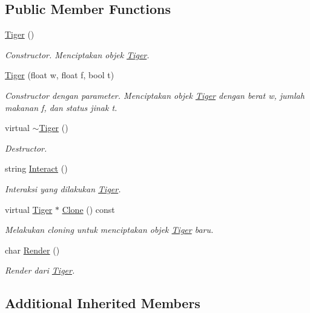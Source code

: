 \subsection*{Public Member Functions}
\begin{DoxyCompactItemize}
\item 
\hyperlink{classTiger_ab2b455a0cdbd21f2052eef2a176f0eeb}{Tiger} ()
\begin{DoxyCompactList}\small\item\em Constructor. Menciptakan objek \hyperlink{classTiger}{Tiger}. \end{DoxyCompactList}\item 
\hyperlink{classTiger_ade1e562b2af36ee2838d3bc6dc95042b}{Tiger} (float w, float f, bool t)
\begin{DoxyCompactList}\small\item\em Constructor dengan parameter. Menciptakan objek \hyperlink{classTiger}{Tiger} dengan berat w, jumlah makanan f, dan status jinak t. \end{DoxyCompactList}\item 
virtual \hyperlink{classTiger_ae9a0109993b438dd7405b4018ba62d4b}{$\sim$\+Tiger} ()
\begin{DoxyCompactList}\small\item\em Destructor. \end{DoxyCompactList}\item 
string \hyperlink{classTiger_ae318cc373300a52e13598f42368a2c70}{Interact} ()
\begin{DoxyCompactList}\small\item\em Interaksi yang dilakukan \hyperlink{classTiger}{Tiger}. \end{DoxyCompactList}\item 
virtual \hyperlink{classTiger}{Tiger} $\ast$ \hyperlink{classTiger_aa376d57a4b2d56edb586f7ba1b170037}{Clone} () const 
\begin{DoxyCompactList}\small\item\em Melakukan cloning untuk menciptakan objek \hyperlink{classTiger}{Tiger} baru. \end{DoxyCompactList}\item 
char \hyperlink{classTiger_a42b09a0bfc8c115e7383e926513fb371}{Render} ()
\begin{DoxyCompactList}\small\item\em Render dari \hyperlink{classTiger}{Tiger}. \end{DoxyCompactList}\end{DoxyCompactItemize}
\subsection*{Additional Inherited Members}


